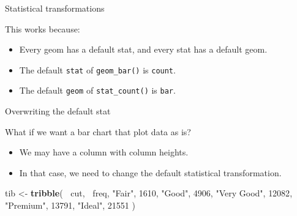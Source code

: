\documentclass[ignorenonframetext,]{beamer}
\newenvironment{Shaded}{\begin{snugshade}}{\end{snugshade}}
\newcommand{\DecValTok}[1]{\textcolor[rgb]{0.00,0.00,0.81}{#1}}
\newcommand{\KeywordTok}[1]{\textcolor[rgb]{0.13,0.29,0.53}{\textbf{#1}}}
\newcommand{\NormalTok}[1]{#1}
\newcommand{\OperatorTok}[1]{\textcolor[rgb]{0.81,0.36,0.00}{\textbf{#1}}}
\newcommand{\StringTok}[1]{\textcolor[rgb]{0.31,0.60,0.02}{#1}}
\providecommand{\tightlist}{%
  \setlength{\itemsep}{0pt}\setlength{\parskip}{0pt}}
\begin{document}
\begin{frame}[fragile]{Statistical transformations}
\protect\hypertarget{statistical-transformations-6}{}

This works because:

\begin{itemize}
\item
  Every geom has a default stat, and every stat has a default geom.
\item
  The default \texttt{stat} of \texttt{geom\_bar()} is \texttt{count}.
\item
  The default \texttt{geom} of \texttt{stat\_count()} is \texttt{bar}.
\end{itemize}

\end{frame}

\begin{frame}[fragile]{Overwriting the default stat}
\protect\hypertarget{overwriting-the-default-stat}{}

What if we want a bar chart that plot data as is?

\begin{itemize}
\tightlist
\item
  We may have a column with column heights.
\item
  In that case, we need to change the default statistical
  transformation.
\end{itemize}

\begin{Shaded}
\begin{Highlighting}[]
\NormalTok{tib <-}\StringTok{ }\KeywordTok{tribble}\NormalTok{(}
  \OperatorTok{~}\NormalTok{cut,         }\OperatorTok{~}\NormalTok{freq,}
  \StringTok{"Fair"}\NormalTok{,       }\DecValTok{1610}\NormalTok{,}
  \StringTok{"Good"}\NormalTok{,       }\DecValTok{4906}\NormalTok{,}
  \StringTok{"Very Good"}\NormalTok{,  }\DecValTok{12082}\NormalTok{,}
  \StringTok{"Premium"}\NormalTok{,    }\DecValTok{13791}\NormalTok{,}
  \StringTok{"Ideal"}\NormalTok{,      }\DecValTok{21551}
\NormalTok{)}
\end{Highlighting}
\end{Shaded}

\end{frame}
\end{document}
